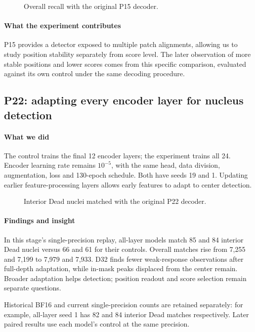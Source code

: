 \documentclass[
  12pt,
]{article}
\begin{document}
\begin{figure}[H]\centering\caption{Overall recall with the original P15 decoder.}\end{figure}
\paragraph{What the experiment contributes}
P15 provides a detector exposed to multiple patch alignments, allowing us to study position stability separately from score level. The later observation of more stable positions and lower scores comes from this specific comparison, evaluated against its own control under the same decoding procedure.

\subsection{P22: adapting every encoder layer for nucleus detection}\label{chapter6}
\paragraph{What we did}
The control trains the final 12 encoder layers; the experiment trains all 24. Encoder learning rate remains $10^{-5}$, with the same head, data division, augmentation, loss and 130-epoch schedule. Both have seeds 19 and 1. Updating earlier feature-processing layers allows early features to adapt to center detection.

\begin{figure}[H]\centering\caption{Interior Dead nuclei matched with the original P22 decoder.}\end{figure}
\paragraph{Findings and insight}
In this stage’s single-precision replay, all-layer models match 85 and 84 interior Dead nuclei versus 66 and 61 for their controls. Overall matches rise from 7,255 and 7,199 to 7,979 and 7,933. D32 finds fewer weak-response observations after full-depth adaptation, while in-mask peaks displaced from the center remain. Broader adaptation helps detection; position readout and score selection remain separate questions.

Historical BF16 and current single-precision counts are retained separately: for example, all-layer seed 1 has 82 and 84 interior Dead matches respectively. Later paired results use each model’s control at the same precision.
\end{document}
